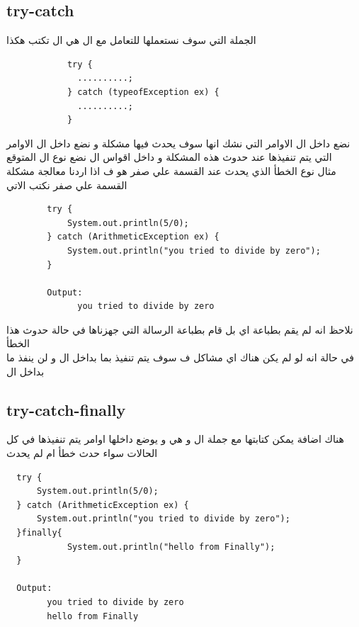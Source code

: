 \subsection{try-catch}
\begin{AR}
  الجملة التي سوف نستعملها للتعامل مع ال هي ال  تكتب هكذا
\end{AR}
\begin{verbatim}
            try {
              ..........;
            } catch (typeofException ex) {
              ..........;
            }
\end{verbatim}
\begin{AR}
  نضع داخل ال الاوامر التي نشك انها سوف يحدث فيها مشكلة 
  و نضع داخل ال  الاوامر التي يتم تنفيذها عند حدوث هذه المشكلة
  و داخل اقواس ال نضع نوع ال المتوقع
  \\
  مثال نوع الخطأ الذي يحدث عند القسمة علي صفر هو  ف اذا اردنا معالجة مشكلة القسمة علي صفر نكتب الاتي
\end{AR}
\begin{verbatim}
        try {
            System.out.println(5/0);
        } catch (ArithmeticException ex) {
            System.out.println("you tried to divide by zero");
        }
        
        Output:
              you tried to divide by zero
\end{verbatim}
\begin{AR}
  نلاحظ انه لم يقم بطباعة اي  بل قام بطباعة الرسالة التي جهزناها في حالة حدوث هذا الخطأ
  \\
  في حالة انه لو لم يكن هناك اي مشاكل ف سوف يتم تنفيذ بما بداخل ال  و لن ينفذ ما بداخل ال 
\end{AR}
\subsection{try-catch-finally}
\begin{AR}
  هناك اضافة يمكن كتابتها مع جملة ال و هي 
   و يوضع داخلها اوامر يتم تنفيذها في كل الحالات سواء حدث خطأ ام لم يحدث
\end{AR}
\begin{verbatim}
  try {
      System.out.println(5/0);
  } catch (ArithmeticException ex) {
      System.out.println("you tried to divide by zero");
  }finally{
            System.out.println("hello from Finally");
  }
  
  Output:
        you tried to divide by zero
        hello from Finally
\end{verbatim}


